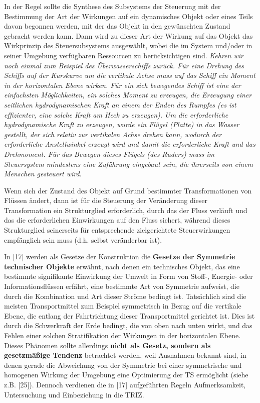 \documentclass[11pt,a4paper]{article}
\begin{document}
In der Regel sollte die Synthese des Subsystems der Steuerung mit der
Bestimmung der Art der Wirkungen auf ein dynamisches Objekt oder eines Teils
davon begonnen werden, mit der das Objekt in den gewünschten Zustand gebracht
werden kann. Dann wird zu dieser Art der Wirkung auf das Objekt das
Wirkprinzip des Steuersubsystems ausgewählt, wobei die im System und/oder in
seiner Umgebung verfügbaren Ressourcen zu berücksichtigen sind.  \emph{Kehren
  wir noch einmal zum Beispiel des Überwasserschiffs zurück.  Für eine Drehung
  des Schiffs auf der Kurskurve um die vertikale Achse muss auf das Schiff ein
  Moment in der horizontalen Ebene wirken. Für ein sich bewegendes Schiff ist
  eine der einfachsten Möglichkeiten, ein solches Moment zu erzeugen, die
  Erzeugung einer seitlichen hydrodynamischen Kraft an einem der Enden des
  Rumpfes (es ist effizienter, eine solche Kraft am Heck zu erzeugen). Um die
  erforderliche hydrodynamische Kraft zu erzeugen, wurde ein Flügel (Platte)
  in das Wasser gestellt, der sich relativ zur vertikalen Achse drehen kann,
  wodurch der erforderliche Anstellwinkel erzeugt wird und damit die
  erforderliche Kraft und das Drehmoment. Für das Bewegen dieses Flügels (des
  Ruders) muss im Steuersystem mindestens eine Zuführung eingebaut sein, die
  ihrerseits von einem Menschen gesteuert wird}.

Wenn sich der Zustand des Objekt auf Grund bestimmter Transformationen von
Flüssen ändert, dann ist für die Steuerung der Veränderung dieser
Transformation ein Strukturglied erforderlich, durch das der Fluss verläuft
und das die erforderlichen Einwirkungen auf den Fluss sichert, während dieses
Strukturglied seinerseits für entsprechende zielgerichtete Steuerwirkungen
empfänglich sein muss (d.h. selbst veränderbar ist).

In [17] werden als Gesetze der Konstruktion die \textbf{Gesetze der Symmetrie
  technischer Objekte} erwähnt, nach denen ein technisches Objekt, das eine
bestimmte signifikante Einwirkung der Umwelt in Form von Stoff-, Energie- oder
Informationsflüssen erfährt, eine bestimmte Art von Symmetrie aufweist, die
durch die Kombination und Art dieser Ströme bedingt ist. Tatsächlich sind die
meisten Transportmittel zum Beispiel symmetrisch in Bezug auf die vertikale
Ebene, die entlang der Fahrtrichtung dieser Transportmittel gerichtet ist.
Dies ist durch die Schwerkraft der Erde bedingt, die von oben nach unten
wirkt, und das Fehlen einer solchen Stratifikation der Wirkungen in der
horizontalen Ebene. Dieses Phänomen sollte allerdings \textbf{nicht als
  Gesetz, sondern als gesetzmäßige Tendenz} betrachtet werden, weil Ausnahmen
bekannt sind, in denen gerade die Abweichung von der Symmetrie bei einer
symmetrische und homogenen Wirkung der Umgebung eine Optimierung der TS
ermöglicht (siehe z.B. [25]). Dennoch verdienen die in [17] aufgeführten
Regeln Aufmerksamkeit, Untersuchung und Einbeziehung in die TRIZ.
\end{document}
